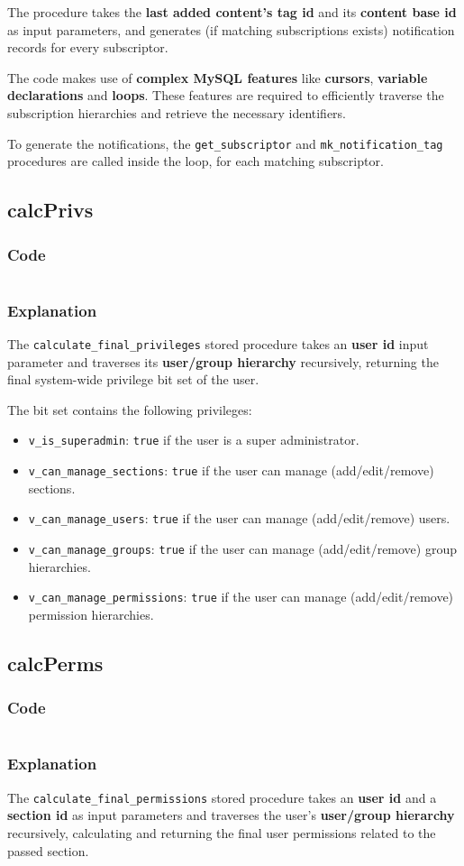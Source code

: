 \documentclass[12pt]{report}
\renewcommand\emph{\textbf}
\newcommand{\printSQLtest}[1]
{
    \inputminted[linenos, breaklines, breakbytoken, tabsize=4, fontsize=\footnotesize]{mysql}{#1}
}
\newcommand{\printSQLTablepage}[2]
{    
    \subsection{#2}
    \subsubsection{Code}
    \printSQLtest{../sql/parts/#1}
    \subsubsection{Explanation}
}
\begin{document}
                    The procedure takes the \emph{last added content's tag id} and its \emph{content base id} as input parameters, and generates (if matching subscriptions exists) notification records for every subscriptor.

                    The code makes use of \emph{complex MySQL features} like \emph{cursors}, \emph{variable declarations} and \emph{loops}.
                    These features are required to efficiently traverse the subscription hierarchies and retrieve the necessary identifiers.

                    To generate the notifications, the \texttt{get_subscriptor} and \texttt{mk_notification_tag} procedures are called inside the loop, for each matching subscriptor.

                \newpage

                \printSQLTablepage{28_procCalcPrivs.sql}{calcPrivs}
                    The \texttt{calculate_final_privileges} stored procedure takes an \emph{user id} input parameter and traverses its \emph{user/group hierarchy} recursively, returning the final system-wide privilege bit set of the user.

                    The bit set contains the following privileges:

                    \begin{itemize}
                        \item \texttt{v_is_superadmin}: \texttt{true} if the user is a super administrator.
                        \item \texttt{v_can_manage_sections}: \texttt{true} if the user can manage (add/edit/remove) sections.
                        \item \texttt{v_can_manage_users}: \texttt{true} if the user can manage (add/edit/remove) users.
                        \item \texttt{v_can_manage_groups}: \texttt{true} if the user can manage (add/edit/remove) group hierarchies.
                        \item \texttt{v_can_manage_permissions}: \texttt{true} if the user can manage (add/edit/remove) permission hierarchies.
                    \end{itemize}

                \newpage

                \printSQLTablepage{29_procCalcPerms.sql}{calcPerms}
                    The \texttt{calculate_final_permissions} stored procedure takes an \emph{user id} and a \emph{section id} as input parameters and traverses the user's \emph{user/group hierarchy} recursively, calculating and returning the final user permissions related to the passed section.
\end{document}
